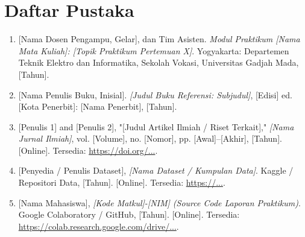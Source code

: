 
\chapter{Daftar Pustaka}
\label{chap:daftarpustaka}

\begin{enumerate}
    \item \label{modulPraktikum} [Nama Dosen Pengampu, Gelar], dan Tim Asisten. \textit{Modul Praktikum [Nama Mata Kuliah]: [Topik Praktikum Pertemuan X]}. Yogyakarta: Departemen Teknik Elektro dan Informatika, Sekolah Vokasi, Universitas Gadjah Mada, [Tahun].
    
    \item \label{bukuTeks} [Nama Penulis Buku, Inisial]. \textit{[Judul Buku Referensi: Subjudul]}, [Edisi] ed. [Kota Penerbit]: [Nama Penerbit], [Tahun].
    
    \item \label{jurnalIlmiah} [Penulis 1] and [Penulis 2], "[Judul Artikel Ilmiah / Riset Terkait]," \textit{[Nama Jurnal Ilmiah]}, vol. [Volume], no. [Nomor], pp. [Awal]--[Akhir], [Tahun]. [Online]. Tersedia: \url{https://doi.org/...}.
    
    \item \label{sumberDataset} [Penyedia / Penulis Dataset], \textit{[Nama Dataset / Kumpulan Data]}. Kaggle / Repositori Data, [Tahun]. [Online]. Tersedia: \url{https://...}.
    
    \item \label{sourceCode} [Nama Mahasiswa], \textit{[Kode Matkul]-[NIM] (Source Code Laporan Praktikum)}. Google Colaboratory / GitHub, [Tahun]. [Online]. Tersedia: \url{https://colab.research.google.com/drive/...}.
\end{enumerate}
